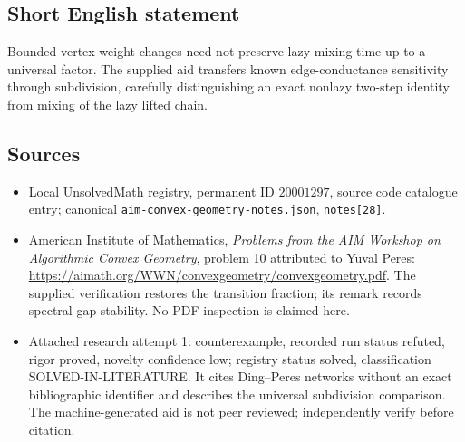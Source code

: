 \documentclass[11pt]{article}
\begin{document}
\subsection{Short English statement}
Bounded vertex-weight changes need not preserve lazy mixing time up to a universal factor. The supplied aid transfers known edge-conductance sensitivity through subdivision, carefully distinguishing an exact nonlazy two-step identity from mixing of the lazy lifted chain.
\subsection{Sources}
\begin{itemize}
\item Local UnsolvedMath registry, permanent ID $20001297$, source code catalogue entry; canonical \texttt{aim-convex-geometry-notes.json}, \texttt{notes[28]}.
\item American Institute of Mathematics, \emph{Problems from the AIM Workshop on Algorithmic Convex Geometry}, problem 10 attributed to Yuval Peres: \url{https://aimath.org/WWN/convexgeometry/convexgeometry.pdf}. The supplied verification restores the transition fraction; its remark records spectral-gap stability. No PDF inspection is claimed here.
\item Attached research attempt 1: counterexample, recorded run status refuted, rigor proved, novelty confidence low; registry status solved, classification SOLVED-IN-LITERATURE. It cites Ding--Peres networks without an exact bibliographic identifier and describes the universal subdivision comparison. The machine-generated aid is not peer reviewed; independently verify before citation.
\end{itemize}
\end{document}

